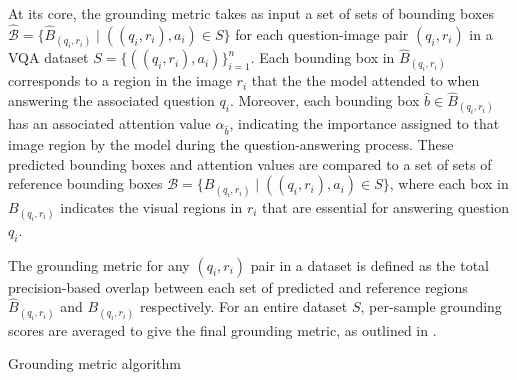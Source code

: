 At its core, the grounding metric takes as input a set of sets of bounding boxes \(\hat{\mathcal{B}} = \{\hat{B}_{(q_i, r_i)} \mid ((q_i, r_i), a_i) \in S\}\) for each question-image pair \((q_i, r_i)\) in a VQA dataset \(S = \{((q_i, r_i), a_i)\}_{i=1}^n\). Each bounding box in \(\hat{B}_{(q_i, r_i)}\) corresponds to a region in the image \(r_i\) that the the model attended to when answering the associated question \(q_i\). Moreover, each bounding box \(\hat{b} \in \hat{B}_{(q_i, r_i)}\) has an associated attention value \(\alpha_{\hat{b}}\), indicating the importance assigned to that image region by the model during the question-answering process. These predicted bounding boxes and attention values are compared to a set of sets of reference bounding boxes \(\mathcal{B} = \{B_{(q_i, r_i)} \mid ((q_i, r_i), a_i) \in S\}\), where each box in \(B_{(q_i, r_i)}\) indicates the visual regions in \(r_i\) that are essential for answering question \(q_i\).

The grounding metric for any \((q_i, r_i)\) pair in a dataset is defined as the total precision-based overlap between each set of predicted and reference regions \(\hat{B}_{(q_i, r_i)}\) and \(B_{(q_i, r_i)}\) respectively. For an entire dataset \(S\), per-sample grounding scores are averaged to give the final grounding metric, as outlined in \algorithmautorefname{ \ref{algorithm:grounding}}.

\begin{algorithm}[htbp]
    \caption[Grounding metric algorithm]{Grounding metric algorithm}
    \label{algorithm:grounding}
\end{algorithm}

